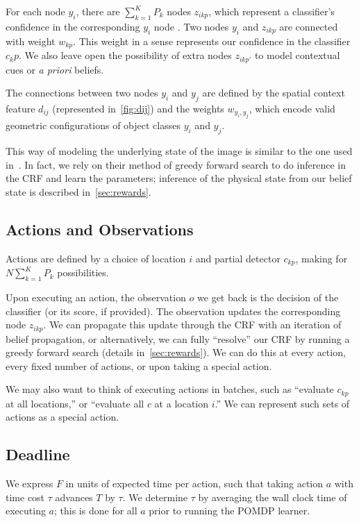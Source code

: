 For each node $y_i$, there are $\sum_{k=1}^K P_k$ nodes $z_{ikp}$, which represent a classifier's confidence in the corresponding $y_i$ node .
Two nodes $y_i$ and $z_{ikp}$ are connected with weight $w_{kp}$.
This weight in a sense represents our confidence in the classifier $c_kp$.
We also leave open the possibility of extra nodes $z_{ikp'}$ to model contextual cues or \emph{a priori} beliefs.

The connections between two nodes $y_i$ and $y_j$ are defined by the spatial context feature $d_{ij}$ (represented in~\autoref{fig:dij}) and the weights $w_{y_i,y_j}$, which encode valid geometric configurations of object classes $y_i$ and $y_j$.


This way of modeling the underlying state of the image is similar to the one used in~\cite{Desai2009}.
In fact, we rely on their method of greedy forward search to do inference in the CRF and learn the parameters; inference of the physical state from our belief state is described in~\autoref{sec:rewards}.

\subsection{Actions and Observations} \label{sec:actions}
Actions are defined by a choice of location $i$ and partial detector $c_{kp}$, making for $N \sum_{k=1}^K P_k$ possibilities.

Upon executing an action, the observation $o$ we get back is the decision of the classifier (or its score, if provided).
The observation updates the corresponding node $z_{ikp}$.
We can propagate this update through the CRF with an iteration of belief propagation, or alternatively, we can fully ``resolve'' our CRF by running a greedy forward search (details in~\autoref{sec:rewards}).
We can do this at every action, every fixed number of actions, or upon taking a special action.

We may also want to think of executing actions in batches, such as ``evaluate $c_{kp}$ at all locations,'' or ``evaluate all $c$ at a location $i$.''
We can represent such sets of actions as a special action.

\subsection{Deadline} \label{sec:deadlines}
We express $F$ in units of expected time per action, such that taking action $a$ with time cost $\tau$ advances $T$ by $\tau$.
We determine $\tau$ by averaging the wall clock time of executing $a$; this is done for all $a$ prior to running the POMDP learner.


